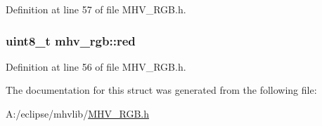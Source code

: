 Definition at line 57 of file M\-H\-V\-\_\-\-R\-G\-B.\-h.

\hypertarget{structmhv__rgb_a0f10bc24930951dba3e243614179d493}{
\subsubsection[{red}]{\setlength{\rightskip}{0pt plus 5cm}uint8\-\_\-t mhv\-\_\-rgb\-::red}}\label{structmhv__rgb_a0f10bc24930951dba3e243614179d493}


Definition at line 56 of file M\-H\-V\-\_\-\-R\-G\-B.\-h.



The documentation for this struct was generated from the following file\-:\begin{DoxyCompactItemize}
\item 
A\-:/eclipse/mhvlib/\hyperlink{_m_h_v___r_g_b_8h}{M\-H\-V\-\_\-\-R\-G\-B.\-h}\end{DoxyCompactItemize}
